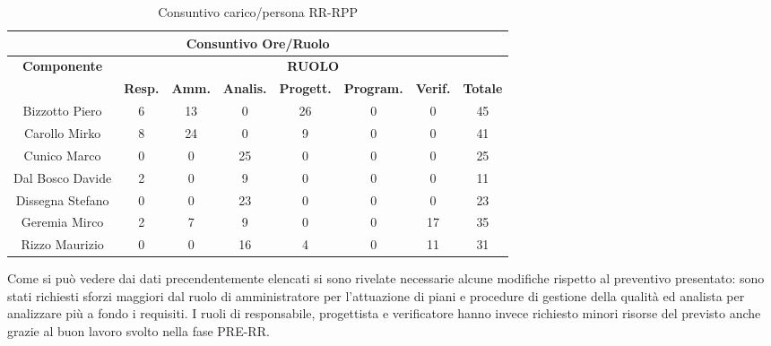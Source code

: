 \begin{table}[!h]
	\begin{center}
		  \begin{tabular}
			  {|c|c|c|c|c|c|c|c|}
		 \hline
			\multicolumn{8}{|c|}{ \textbf{Consuntivo Ore/Ruolo} } \\
			\hline
			\textbf{Componente} & \multicolumn{7}{|c|}{ \textbf{RUOLO} } \\
			\hline
			& \textbf{Resp.} & \textbf{Amm.} & \textbf{Analis.} & \textbf{Progett.} & \textbf{Program.} & \textbf{Verif.}  & \textbf{Totale}\\
			\hline
			Bizzotto Piero &  6   &  13 &  0   &   26  &  0   &  0  &  45 \\ %
			\hline
			Carollo Mirko &  8   &  24  &  0  &  9   &  0   &  0   &  41\\ %
			\hline
			Cunico Marco    &  0   &  0  &  25   &  0   &  0  &  0   &  25\\ %
			\hline
			Dal Bosco Davide   &  2   &  0   &  9   &  0   &   0  &  0  &  11\\ %
			\hline
			Dissegna Stefano        &  0  &  0   & 23  &  0   &  0  &  0  &  23\\ %
			\hline
			Geremia Mirco   &   2  &  7   &  9  &  0  &  0   &  17   &  35\\ %
			\hline	
			Rizzo Maurizio  &  0  &  0  &  16  &  4  &  0  &  11  &  31 \\ %
			\hline	
		\end{tabular}
	\caption{Consuntivo carico/persona RR-RPP} %
	\label{tab: ConsPersOre_RR-RPP}
	\end{center}	
\end{table}

Come si pu\`o vedere dai dati precendentemente elencati si sono rivelate necessarie alcune modifiche rispetto al preventivo presentato:
sono stati richiesti sforzi maggiori dal ruolo di amministratore per l'attuazione di piani e procedure di gestione della qualit\`a ed
analista per analizzare pi\`u a fondo i requisiti. I ruoli di responsabile, progettista e verificatore hanno invece richiesto minori
risorse del previsto anche grazie al buon lavoro svolto nella fase PRE-RR.

